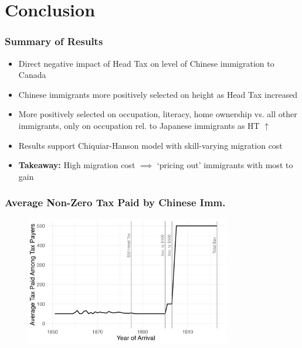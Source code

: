\documentclass[xcolor=dvipsnames, compress, 12pt, aspectratio=169, handout]{beamer}
\begin{document}
\section{Conclusion}
\begin{frame}
    \frametitle{Summary of Results}
    \begin{itemize}
        \item Direct negative impact of Head Tax on level of Chinese immigration to Canada \vspace{2mm}
        \item Chinese immigrants more positively selected on height as Head Tax increased \vspace{2mm}
        \item More positively selected on occupation, literacy, home ownership vs. all other immigrants, only on occupation rel. to Japanese immigrants as HT $\uparrow$ \vspace{2mm}
        \item Results support Chiquiar-Hanson model with skill-varying migration cost  \vspace{2mm}
        \item \textbf{Takeaway:} High migration cost $\implies$ `pricing out' immigrants with most to gain  \vspace{2mm}
    \end{itemize}
\end{frame}

\appendix 
\begin{frame}
    \label{figa1_tax}
    \frametitle{Average Non-Zero Tax Paid by Chinese Imm.  \hyperlink{headtaxinfo}{}}
    \centering
    \begin{figure}
        \includegraphics[width = 0.8\textwidth]{../../figs/slides/fig1_taxespaid.png}
    \end{figure}
\end{frame}
\end{document}
